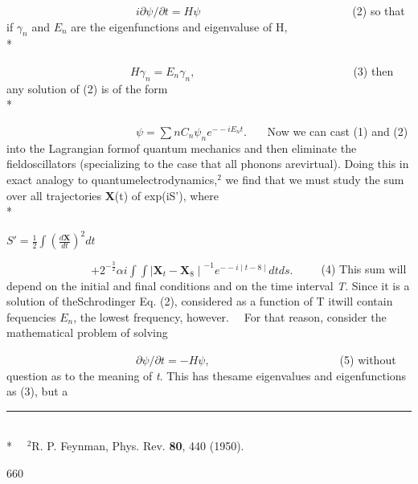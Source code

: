 \documentclass[8pt,a4paper]{extarticle}
\begin{document}
\begin{multicols}{2}
\begin{flushright}
			~~~~~~~~~~~~~~~~~~~~~~~$ i\partial\psi/\partial t=\textit{H}\psi$~~~~~~~~~~~~~~~~~~~~~~~~~~~(2)
		\justify
		so that if $\gamma_n$ and $\textit{E}_n$ are the eigenfunctions and eigenvaluse of H,\\*

		~~~~~~~~~~~~~~~~~~~~~~$ \textit{H}\gamma_n=\textit{E}_n\gamma_n,$~~~~~~~~~~~~~~~~~~~~~~~~~~~~(3)
		\justify
		then any solution of (2) is of the form\\*

			~~~~~~~~~~~~~~~~~~~~~~~$ \psi=\sum{n}\textit{C}_n\psi_ne^{--i{E}_{n}t}$.
		\justify
		~~~Now we can cast (1) and (2) into the Lagrangian form\linebreak of quantum mechanics and then eliminate the field\linebreak oscillators (specializing to the case that all phonons are\linebreak virtual). Doing this in exact analogy to quantum\linebreak electrodynamics,$^2$ we find that we must study the sum over all trajectories \textbf{X}(t) of exp(iS'), where\\*

		$ S'=\frac{1}{2}\int(\frac{d\textbf{X}}{dt})^2dt$~~~~~~~~~~~~~~~~~~~~~~~~~~~~~~~~~~~~~~~~~~~~~

		~~~~~~~~~~~~~~~$ +2^{-\frac{3}{2}}\alpha i\int\int{\mid \textbf{X}_t-\textbf{X}_8\mid}^{-1}e^{--i\mid t-8\mid}dtds.$~~~~~(4)
		\justify
		This sum will depend on the initial and final conditions\linebreak
		and on the time interval \textit{T}. Since it is a solution of the\linebreak Schrodinger Eq. (2), considered as a function of T it\linebreak will contain fequencies $E_n$, the lowest frequency, however.\linebreak
		~~For that reason, consider the mathematical problem\linebreak
		of solving

		~~~~~~~~~~~~~~~~~~~~~~~$\partial\psi/\partial t=-\textit{H}\psi,$~~~~~~~~~~~~~~~~~~~~~~~(5)
		\justify
		without question as to the meaning of \textit{t}. This has the\linebreak same eigenvalues and eigenfunctions as (3), but a
	\end{flushright}
	\begin{flushleft}
	\rule{1,3cm}{0.1pt}\\*
	~~$^2$R. P. Feynman, Phys. Rev. \textbf{80}, 440 (1950).
	\end{flushleft}

\end{multicols}

	\begin{center}
		660
	\end{center}
\end{document}
